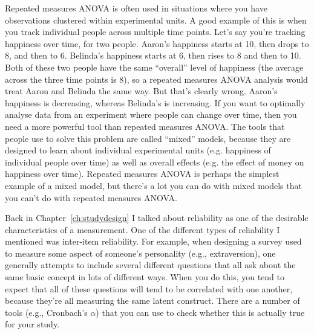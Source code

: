 \begin{itemize}
 Repeated measures ANOVA is often used in situations where you have observations clustered within experimental units. A good example of this is when you track individual people across multiple time points. Let's say you're tracking happiness over time, for two people. Aaron's happiness starts at 10, then drops to 8, and then to 6. Belinda's happiness starts at 6, then rises to 8 and then to 10. Both of these two people have the same ``overall'' level of happiness (the average across the three time points is 8), so a repeated measures ANOVA analysis would treat Aaron and Belinda the same way. But that's clearly wrong. Aaron's happiness is decreasing, whereas Belinda's is increasing. If you want to optimally analyse data from an experiment where people can change over time, then you need a more powerful tool than repeated measures ANOVA. The tools that people use to solve this problem are called ``mixed'' models, because they are designed to learn about individual experimental units (e.g. happiness of individual people over time) as well as overall effects (e.g. the effect of money on happiness over time). Repeated measures ANOVA is perhaps the simplest example of a mixed model, but there's a lot you can do with mixed models that you can't do with repeated measures ANOVA. 

 Back in Chapter~\ref{ch:studydesign} I talked about reliability as one of the desirable characteristics of a measurement. One of the different types of reliability I mentioned was inter-item reliability. For example, when designing a survey used to measure some aspect of someone's personality (e.g., extraversion), one generally attempts to include several different questions that all ask about the same basic concept in lots of different ways. When you do this, you tend to expect that all of these questions will tend to be correlated with one another, because they're all measuring the same latent construct. There are a number of tools (e.g., Cronbach's $\alpha$) that you can use to check whether this is actually true for your study. 


\end{itemize}
